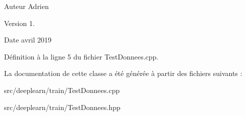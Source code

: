 \begin{DoxyAuthor}{Auteur}
Adrien 
\end{DoxyAuthor}
\begin{DoxyVersion}{Version}
1. 
\end{DoxyVersion}
\begin{DoxyDate}{Date}
avril 2019 
\end{DoxyDate}


Définition à la ligne 5 du fichier Test\+Donnees.\+cpp.



La documentation de cette classe a été générée à partir des fichiers suivants \+:\begin{DoxyCompactItemize}
\item 
src/deeplearn/train/Test\+Donnees.\+cpp\item 
src/deeplearn/train/Test\+Donnees.\+hpp\end{DoxyCompactItemize}

